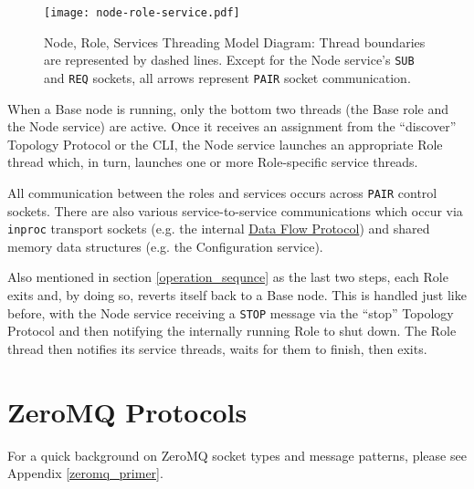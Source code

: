 \begin{figure}[H]
    \centering
    \texttt{[image: node-role-service.pdf]}
    \caption[Node, Role, Services Threading Model Diagram]
            {Node, Role, Services Threading Model Diagram: Thread boundaries are represented by dashed lines. Except for
	     the Node service's \texttt{SUB} and \texttt{REQ} sockets, all arrows represent \texttt{PAIR} socket
	     communication.}
    \label{fig:node_role_service_image}
\end{figure}

When a Base node is running, only the bottom two threads (the Base role and the Node service) are active. Once it
receives an assignment from the ``discover'' Topology Protocol or the \dcamp CLI, the Node service launches an
appropriate Role thread which, in turn, launches one or more Role-specific service threads.

All communication between the roles and services occurs across \texttt{PAIR} control sockets. There are also various
service-to-service communications which occur via \texttt{inproc} transport sockets (e.g. the internal
\hyperref[proto_data]{Data Flow Protocol}) and shared memory data structures (e.g. the Configuration service).

Also mentioned in section \ref{operation_sequnce} as the last two steps, each Role exits and, by doing so, reverts
itself back to a Base node. This is handled just like before, with the Node service receiving a \texttt{STOP} message
via the ``stop'' Topology Protocol and then notifying the internally running Role to shut down. The Role thread then
notifies its service threads, waits for them to finish, then exits.

\section{ZeroMQ Protocols}

For a quick background on ZeroMQ socket types and message patterns, please see Appendix \ref{zeromq_primer}.






